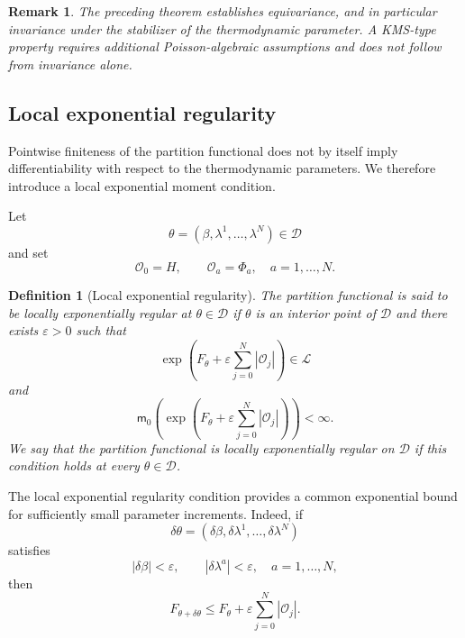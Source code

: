 \documentclass[11pt,reqno]{amsart}
\newtheorem{Definition}[Theorem]{Definition}
\newtheorem{rem}[Theorem]{Remark}
\begin{document}
\begin{rem}
The preceding theorem establishes equivariance, and in particular
invariance under the stabilizer of the thermodynamic parameter. A
KMS-type property requires additional Poisson-algebraic assumptions and
does not follow from invariance alone.
\end{rem}

\subsection{Local exponential regularity}
\label{subsec:local-exponential-regularity}

Pointwise finiteness of the partition functional does not by itself
imply differentiability with respect to the thermodynamic parameters.
We therefore introduce a local exponential moment condition.

Let
\[
\theta=(\beta,\lambda^1,\ldots,\lambda^N)\in\mathcal D
\]
and set
\[
\mathcal O_0=H,
\qquad
\mathcal O_a=\Phi_a,
\quad
a=1,\ldots,N.
\]

\begin{Definition}[Local exponential regularity]
\label{def:local-exponential-regularity}
The partition functional is said to be
\emph{locally exponentially regular at $\theta\in\mathcal D$} if
$\theta$ is an interior point of $\mathcal D$ and there exists
$\varepsilon>0$ such that
\[
\exp\left(
F_\theta+\varepsilon\sum_{j=0}^{N}|\mathcal O_j|
\right)
\in\mathcal L
\]
and
\[
\mathsf m_0\left(
\exp\left(
F_\theta+\varepsilon\sum_{j=0}^{N}|\mathcal O_j|
\right)
\right)
<\infty.
\]
We say that the partition functional is locally exponentially regular
on $\mathcal D$ if this condition holds at every
$\theta\in\mathcal D$.
\end{Definition}

The local exponential regularity condition provides a common
exponential bound for sufficiently small parameter increments. Indeed,
if
\[
\delta\theta
=
(\delta\beta,\delta\lambda^1,\ldots,\delta\lambda^N)
\]
satisfies
\[
|\delta\beta|<\varepsilon,
\qquad
|\delta\lambda^a|<\varepsilon,
\quad
a=1,\ldots,N,
\]
then
\[
F_{\theta+\delta\theta}
\leq
F_\theta
+
\varepsilon\sum_{j=0}^{N}|\mathcal O_j|.
\]
\end{document}
